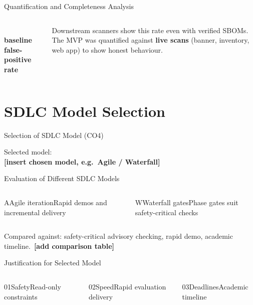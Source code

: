 \documentclass[aspectratio=169,12pt]{beamer}
\newlength{\ch}\setlength{\ch}{47mm}
\newcommand{\ph}[1]{\textcolor{accent}{\textbf{[#1]}}}
\begin{document}
\begin{frame}{Quantification and Completeness Analysis}
\begin{columns}[c,onlytextwidth]
\\[1mm]{\bfseries baseline false-positive rate}
\begin{wc}[height={44mm},height plus=30mm,valign=center]\large Downstream scanners show this rate even with verified SBOMs. The MVP was quantified against \textbf{live scans} (banner, inventory, web app) to show honest behaviour.\end{wc}
\end{columns}
\end{frame}

\section{SDLC Model Selection}
\begin{frame}{Selection of SDLC Model (CO4)}
\begin{stmt}Selected model:\\[2mm]\textcolor{accent}{\bfseries[insert chosen model, e.g.\ Agile / Waterfall]}\end{stmt}
\end{frame}

\begin{frame}{Evaluation of Different SDLC Models}
\setlength{\ch}{36mm}
\begin{columns}[T,onlytextwidth]
\begin{tc}{A}{Agile iteration}\large Rapid demos and incremental delivery\end{tc}
\begin{tcteal}{W}{Waterfall gates}\large Phase gates suit safety-critical checks\end{tcteal}
\end{columns}\vskip2mm
\begin{wc}\normalsize Compared against: safety-critical advisory checking, rapid demo, academic timeline.\ \ph{add comparison table}\end{wc}
\end{frame}

\begin{frame}{Justification for Selected Model}
\setlength{\ch}{50mm}
\begin{columns}[T,onlytextwidth]
\begin{tc}{01}{Safety}\large Read-only constraints\end{tc}
\begin{tcteal}{02}{Speed}\large Rapid evaluation delivery\end{tcteal}
\begin{tc}{03}{Deadlines}\large Academic timeline\end{tc}
\end{columns}
\end{frame}
\end{document}
